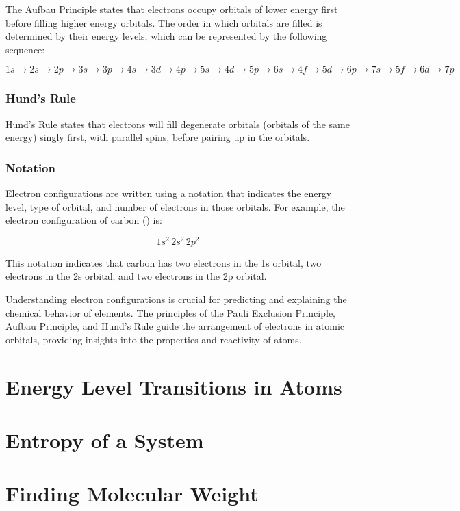\documentclass[10pt, roman]{article}
\begin{document}
The Aufbau Principle states that electrons occupy orbitals of lower energy first before filling higher energy orbitals. The order in which orbitals are filled is determined by their energy levels, which can be represented by the following sequence:

\[
1s \rightarrow 2s \rightarrow 2p \rightarrow 3s \rightarrow 3p \rightarrow 4s \rightarrow 3d \rightarrow 4p \rightarrow 5s \rightarrow 4d \rightarrow 5p \rightarrow 6s \rightarrow 4f \rightarrow 5d \rightarrow 6p \rightarrow 7s \rightarrow 5f \rightarrow 6d \rightarrow 7p
\]

\subsubsection{Hund's Rule}

Hund's Rule states that electrons will fill degenerate orbitals (orbitals of the same energy) singly first, with parallel spins, before pairing up in the orbitals.

\subsubsection{Notation}

Electron configurations are written using a notation that indicates the energy level, type of orbital, and number of electrons in those orbitals. For example, the electron configuration of carbon () is:

\[
1s^2 \, 2s^2 \, 2p^2
\]

This notation indicates that carbon has two electrons in the 1s orbital, two electrons in the 2s orbital, and two electrons in the 2p orbital.

Understanding electron configurations is crucial for predicting and explaining the chemical behavior of elements. The principles of the Pauli Exclusion Principle, Aufbau Principle, and Hund's Rule guide the arrangement of electrons in atomic orbitals, providing insights into the properties and reactivity of atoms.
\section{Energy Level Transitions in Atoms}
\section{Entropy of a System}
\section{Finding Molecular Weight}
\end{document}
